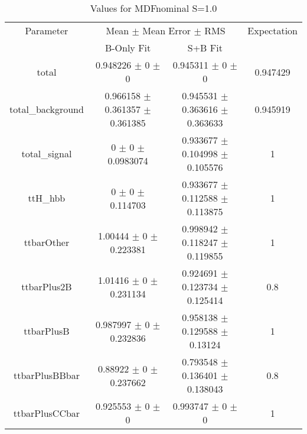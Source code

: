 \begin{table}
\centering
\caption{Values for MDFnominal S=1.0}
\begin{tabular}{cccc}
\toprule
Parameter & \multicolumn{2}{c}{Mean $\pm$ Mean Error $\pm$ RMS} & Expectation\\
 & B-Only Fit & S+B Fit & \\
\midrule
total & \num{0.948226} $\pm$ \num{0} $\pm$ \num{0} & \num{0.945311} $\pm$ \num{0} $\pm$ \num{0} & \num{0.947429}\\
total\_background & \num{0.966158} $\pm$ \num{0.361357} $\pm$ \num{0.361385} & \num{0.945531} $\pm$ \num{0.363616} $\pm$ \num{0.363633} & \num{0.945919}\\
total\_signal & \num{0} $\pm$ \num{0} $\pm$ \num{0.0983074} & \num{0.933677} $\pm$ \num{0.104998} $\pm$ \num{0.105576} & \num{1}\\
ttH\_hbb & \num{0} $\pm$ \num{0} $\pm$ \num{0.114703} & \num{0.933677} $\pm$ \num{0.112588} $\pm$ \num{0.113875} & \num{1}\\
ttbarOther & \num{1.00444} $\pm$ \num{0} $\pm$ \num{0.223381} & \num{0.998942} $\pm$ \num{0.118247} $\pm$ \num{0.119855} & \num{1}\\
ttbarPlus2B & \num{1.01416} $\pm$ \num{0} $\pm$ \num{0.231134} & \num{0.924691} $\pm$ \num{0.123734} $\pm$ \num{0.125414} & \num{0.8}\\
ttbarPlusB & \num{0.987997} $\pm$ \num{0} $\pm$ \num{0.232836} & \num{0.958138} $\pm$ \num{0.129588} $\pm$ \num{0.13124} & \num{1}\\
ttbarPlusBBbar & \num{0.88922} $\pm$ \num{0} $\pm$ \num{0.237662} & \num{0.793548} $\pm$ \num{0.136401} $\pm$ \num{0.138043} & \num{0.8}\\
ttbarPlusCCbar & \num{0.925553} $\pm$ \num{0} $\pm$ \num{0} & \num{0.993747} $\pm$ \num{0} $\pm$ \num{0} & \num{1}\\
\bottomrule
\end{tabular}
\end{table}